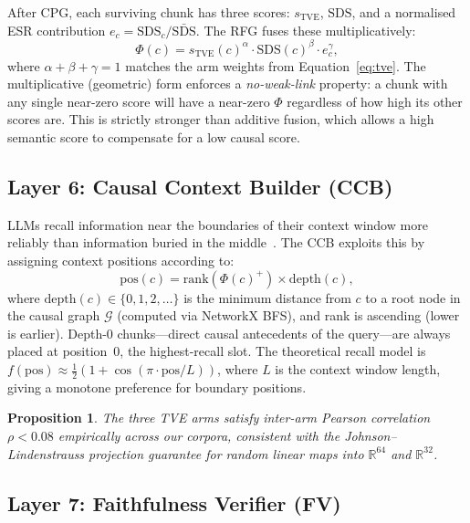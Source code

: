 \documentclass[10pt,twocolumn]{article}
\newtheorem{proposition}{Proposition}
\newcommand{\R}{\mathbb{R}}
\begin{document}
After CPG, each surviving chunk has three scores: $s_\text{TVE}$, $\text{SDS}$,
and a normalised ESR contribution $e_c = \text{SDS}_c / \bar{\text{SDS}}$.
The RFG fuses these multiplicatively:
\begin{equation}\label{eq:rfg}
  \Phi(c) = s_\text{TVE}(c)^{\alpha}\cdot \text{SDS}(c)^{\beta}\cdot e_c^{\gamma},
\end{equation}
where $\alpha+\beta+\gamma=1$ matches the arm weights from Equation~\eqref{eq:tve}.
The multiplicative (geometric) form enforces a \emph{no-weak-link} property:
a chunk with any single near-zero score will have a near-zero $\Phi$ regardless
of how high its other scores are.  This is strictly stronger than additive
fusion, which allows a high semantic score to compensate for a low causal score.

\subsection{Layer 6: Causal Context Builder (CCB)}\label{ssec:ccb}

LLMs recall information near the boundaries of their context window more
reliably than information buried in the middle~\citep{liu2023lost}.  The CCB
exploits this by assigning context positions according to:
\begin{equation}\label{eq:ccb}
  \text{pos}(c) = \text{rank}(\Phi(c)^+)\times \text{depth}(c),
\end{equation}
where $\text{depth}(c) \in \{0,1,2,\ldots\}$ is the minimum distance from $c$
to a root node in the causal graph $\mathcal{G}$ (computed via NetworkX BFS),
and rank is ascending (lower is earlier).  Depth-0 chunks---direct causal
antecedents of the query---are always placed at position~0, the highest-recall
slot.  The theoretical recall model is
$f(\text{pos}) \approx \tfrac{1}{2}(1 + \cos(\pi\cdot\text{pos}/L))$,
where $L$ is the context window length, giving a monotone preference for
boundary positions.

\begin{proposition}\label{prop:jl}
  The three TVE arms satisfy inter-arm Pearson correlation $\rho < 0.08$
  empirically across our corpora, consistent with the Johnson--Lindenstrauss
  projection guarantee for random linear maps into $\R^{64}$ and $\R^{32}$.
\end{proposition}

\subsection{Layer 7: Faithfulness Verifier (FV)}\label{ssec:fv}
\end{document}
